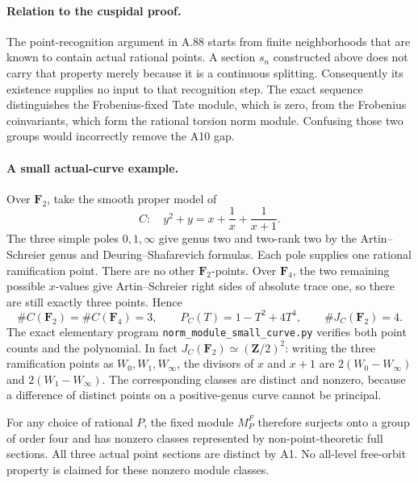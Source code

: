 \documentclass[11pt]{article}
\begin{document}
\paragraph{Relation to the cuspidal proof.}
The point-recognition argument in A.88 starts from
finite neighborhoods that are known to contain
actual rational points. A section $s_n$ constructed
above does not carry that property merely because
it is a continuous splitting. Consequently its
existence supplies no input to that recognition
step. The exact sequence distinguishes the
Frobenius-fixed Tate module, which is zero, from
the Frobenius coinvariants, which form the
rational torsion norm module. Confusing those two
groups would incorrectly remove the A10 gap.

\paragraph{A small actual-curve example.}
Over $\mathbf F_2$, take the smooth proper model of
\[
                   C:\quad y^2+y=x+\frac1x+\frac1{x+1}.
                                                        \tag{A.48.9}
\]
The three simple poles $0,1,\infty$ give genus two
and two-rank two by the Artin--Schreier genus and
Deuring--Shafarevich formulas. Each pole supplies
one rational ramification point. There are no
other $\mathbf F_2$-points. Over $\mathbf F_4$,
the two remaining possible $x$-values give
Artin--Schreier right sides of absolute trace one,
so there are still exactly three points. Hence
\[
 \#C(\mathbf F_2)=\#C(\mathbf F_4)=3,
 \qquad P_C(T)=1-T^2+4T^4,
 \qquad \#J_C(\mathbf F_2)=4.
                                                        \tag{A.48.10}
\]
The exact elementary program
\texttt{norm\_module\_small\_curve.py} verifies
both point counts and the polynomial. In fact
$J_C(\mathbf F_2)\simeq(\mathbf Z/2)^2$:
writing the three ramification points as
$W_0,W_1,W_\infty$, the divisors of $x$ and
$x+1$ are $2(W_0-W_\infty)$ and
$2(W_1-W_\infty)$. The corresponding classes
are distinct and nonzero, because a difference
of distinct points on a positive-genus curve
cannot be principal.

For any choice of rational $P$, the fixed module
$M_P^F$ therefore surjects onto a group of order
four and has nonzero classes represented by
non-point-theoretic full sections. All three
actual point sections are distinct by A1.
No all-level free-orbit property is claimed for
these nonzero module classes.
\end{document}
